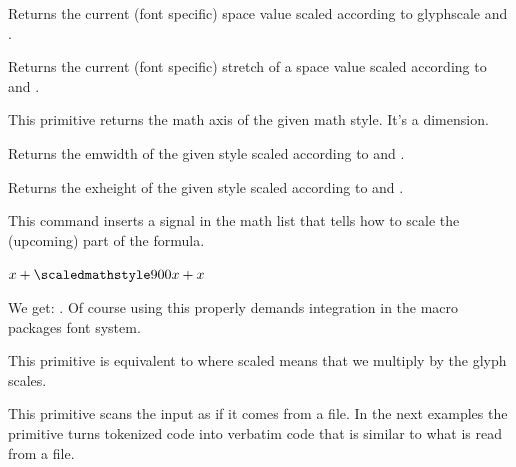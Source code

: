 Returns the current (font specific) space value scaled according to \prm
{glyphscale} and .

\stopnewprimitive

\startnewprimitive[title={\prm {scaledinterwordstretch}}]

Returns the current (font specific) stretch of a space value scaled according to
 and .

\stopnewprimitive

\startnewprimitive[title={\prm {scaledmathaxis}}]

This primitive returns the math axis of the given math style. It's a dimension.

\stopnewprimitive

\startnewprimitive[title={\prm {scaledmathemwidth}}]

Returns the emwidth of the given style scaled according to  and
.

\stopnewprimitive

\startnewprimitive[title={\prm {scaledmathexheight}}]

Returns the exheight of the given style scaled according to  and
.

\stopnewprimitive

\startnewprimitive[title={\prm {scaledmathstyle}}]

This command inserts a signal in the math list that tells how to scale the (upcoming)
part of the formula.

\startbuffer
$ x + {\scaledmathstyle900 x} + x$
\stopbuffer

\typebuffer

We get: \inlinebuffer. Of course using this properly demands integration in the macro
packages font system.

\stopnewprimitive

\startnewprimitive[title={\prm {scaledslantperpoint}}]

This primitive is equivalent to  where \quote
{scaled} means that we multiply by the glyph scales.

\stopnewprimitive

\startnewprimitive[title={\prm {scantextokens}}]

This primitive scans the input as if it comes from a file. In the next examples
the  primitive turns tokenized code into verbatim code that is
similar to what is read from a file.

